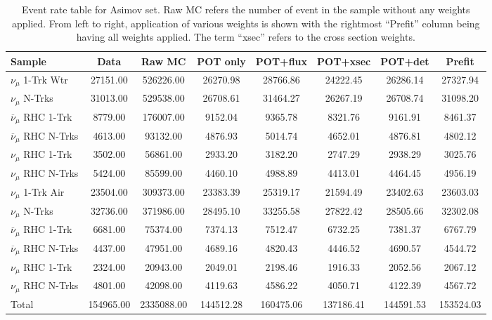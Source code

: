 \begin{table}
\begin{centering}
\begin{tabular}{lccccccc}
\toprule
Sample & Data  & Raw MC & POT only & POT+flux & POT+xsec & POT+det & Prefit\\
\midrule
\midrule
$\nu_\mu$ 1-Trk Wtr &  27151.00 &  526226.00 &  26270.98 &  28766.86 &  24222.45 &  26286.14 &  27327.94\\ 
$\nu_\mu$ N-Trks &  31013.00 &  529538.00 &  26708.61 &  31464.27 &  26267.19 &  26708.74 &  31098.20\\ 
$\overline{\nu}_\mu$ RHC 1-Trk &  8779.00 &  176007.00 &  9152.04 &  9365.78 &  8321.76 &  9161.91 &  8461.37\\ 
$\overline{\nu}_\mu$ RHC N-Trks &  4613.00 &  93132.00 &  4876.93 &  5014.74 &  4652.01 &  4876.81 &  4802.12\\ 
$\nu_\mu$ RHC 1-Trk &  3502.00 &  56861.00 &  2933.20 &  3182.20 &  2747.29 &  2938.29 &  3025.76\\ 
$\nu_\mu$ RHC N-Trks &  5424.00 &  85599.00 &  4460.10 &  4988.89 &  4413.01 &  4464.45 &  4956.19\\ 
$\nu_\mu$ 1-Trk Air &  23504.00 &  309373.00 &  23383.39 &  25319.17 &  21594.49 &  23402.63 &  23603.03\\ 
$\nu_\mu$ N-Trks &  32736.00 &  371986.00 &  28495.10 &  33255.58 &  27822.42 &  28505.66 &  32302.08\\ 
$\overline{\nu}_\mu$ RHC 1-Trk &  6681.00 &  75374.00 &  7374.13 &  7512.47 &  6732.25 &  7381.37 &  6767.79\\ 
$\overline{\nu}_\mu$ RHC N-Trks &  4437.00 &  47951.00 &  4689.16 &  4820.43 &  4446.52 &  4690.57 &  4544.72\\ 
$\nu_\mu$ RHC 1-Trk &  2324.00 &  20943.00 &  2049.01 &  2198.46 &  1916.33 &  2052.56 &  2067.12\\ 
$\nu_\mu$ RHC N-Trks &  4801.00 &  42098.00 &  4119.63 &  4586.22 &  4050.71 &  4122.39 &  4567.72\\ 
\midrule
Total &  154965.00 &  2335088.00 &  144512.28 &  160475.06 &  137186.41 &  144591.53 &  153524.03\\
\bottomrule
\end{tabular}
\end{centering}
\caption[Event Rate Table for Asimov Set]{Event rate table for Asimov set. Raw MC refers the number of event in the sample without any weights applied. From left to right, application of various weights is shown with the rightmost ``Prefit'' column being having all weights applied. The term ``xsec'' refers to the cross section weights.}\label{tab:eventtable}
\end{table}
